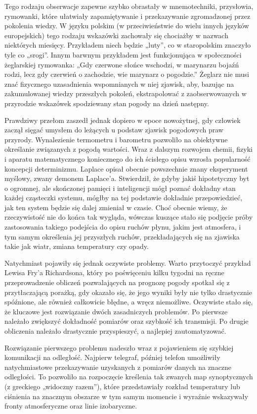\documentclass[a4paper,12pt]{article}
\begin{document}
Tego rodzaju obserwacje zapewne szybko obrastały w mnemotechniki, przysłowia, rymowanki, które ułatwiały zapamiętywanie i przekazywanie zgromadzonej przez pokolenia wiedzy. W języku polskim (w przeciwieństwie do wielu innych języków europejskich) tego rodzaju wskazówki zachowały się chociażby w nazwach niektórych miesięcy. Przykładem niech będzie „luty”, co w staropolskim znaczyło tyle co „srogi”. Innym barwnym przykładem jest funkcjonująca w społeczności żeglarskiej rymowanka: „Gdy czerwone słońce wschodzi, w marynarzu bojaźń rodzi, lecz gdy czerwień o zachodzie, wie marynarz o pogodzie.” Żeglarz nie musi znać fizycznego uzasadnienia wspomnianych w niej zjawisk, aby, bazując na zakumulowanej wiedzy przeszłych pokoleń, ekstrapolować z zaobserwowanych w przyrodzie wskazówek spodziewany stan pogody na dzień następny.

Prawdziwy przełom zaszedł jednak dopiero w epoce nowożytnej, gdy człowiek zaczął sięgać umysłem do leżących u podstaw zjawisk pogodowych praw przyrody. Wynalezienie termometru i barometru pozwoliło na obiektywne określanie związanych z pogodą wartości. Wraz z dalszym rozwojem chemii, fizyki i aparatu matematycznego koniecznego do ich ścisłego opisu wzrosła popularność koncepcji determinizmu. Laplace opisał obecnie powszechnie znany eksperyment myślowy, zwany demonem Laplace’a. Stwierdził, że gdyby jakiś hipotetyczny byt o ogromnej, ale skończonej pamięci i inteligencji mógł poznać dokładny stan każdej cząsteczki systemu, mógłby na tej podstawie dokładnie przepowiedzieć, jak ten system będzie się dalej zmieniał w czasie. Choć obecnie wiemy, że rzeczywistość nie do końca tak wygląda, wówczas kuszące stało się podjęcie próby zastosowania takiego podejścia do opisu ruchów płynu, jakim jest atmosfera, i tym samym określenia jej przyszłych ruchów, przekładających się na zjawiska takie jak wiatr, zmiana temperatury czy opady.

Natychmiast pojawiły się jednak oczywiste problemy. Warto przytoczyć przykład Lewisa Fry’a Richardsona, który po poświęceniu kilku tygodni na ręczne przeprowadzenie obliczeń pozwalających na prognozę pogody spotkał się z przytłaczającą porażką, gdy okazało się, że jego wyniki były nie tylko drastycznie spóźnione, ale również całkowicie błędne, a wręcz niemożliwe. Oczywiste stało się, że kluczowe jest rozwiązanie dwóch zasadniczych problemów. Po pierwsze należało zwiększyć dokładność pomiarów oraz szybkość ich transmisji. Po drugie obliczenia należało drastycznie przyspieszyć, a najlepiej zautomatyzować.

Rozwiązanie pierwszego problemu nadeszło wraz z pojawieniem się szybkiej komunikacji na odległość. Najpierw telegraf, później telefon umożliwiły natychmiastowe przekazywanie uzyskanych z pomiarów danych na znaczne odległości. To pozwoliło na rozpoczęcie kreślenia tak zwanych map synoptycznych (z greckiego „widoczny razem”), które przedstawiały rozkład temperatury lub ciśnienia na znacznym obszarze w tym samym momencie i wyraźnie wskazywały fronty atmosferyczne oraz linie izobaryczne.
\end{document}
